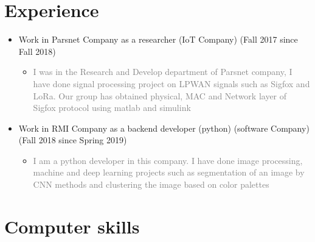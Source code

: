 \documentclass[10pt,a4paper,sans]{moderncv} %
\begin{document}
\section{Experience}
\begin{itemize}
\item Work in Parsnet Company as a  researcher (IoT Company) (Fall 2017 since Fall 2018)
\begin{itemize}
\item
\textcolor{gray}{I was in the Research and Develop department of Parsnet company, I have done signal processing project on LPWAN signals such as Sigfox and LoRa. Our group has obtained physical, MAC and Network layer of Sigfox protocol using matlab and simulink}
\end{itemize}
\item Work in RMI Company as a backend developer (python) (software Company) (Fall 2018 since Spring 2019)
\begin{itemize}
\item
\textcolor{gray}{I am a python developer in this company. I have done image processing, machine and deep learning projects such as segmentation of an image by CNN methods and clustering the image based on color palettes}
\end{itemize}
\end{itemize}

\section{Computer skills}
\end{document}

